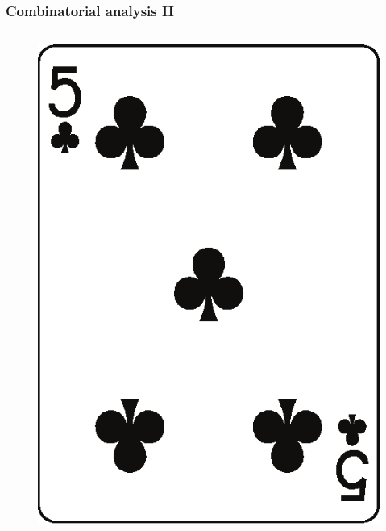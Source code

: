 \documentclass[10pt]{beamer}
\begin{document}
\begin{frame}
\frametitle{Combinatorial analysis II}
 \begin{columns}
  \begin{column}{3cm}
   \begin{figure}
    \includegraphics[width=\linewidth]{im/clubs_5.eps}
   \end{figure}
  \end{column}
  

\end{columns}
\end{frame}
\end{document}
